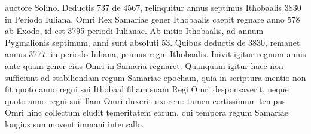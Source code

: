 auctore Solino.
Deductis 737 de 4567, relinquitur annus
septimus Ithobaalis 3830 in Periodo Iuliana.
Omri Rex Samariae
gener Ithobaalis caepit regnare anno 578 ab Exodo, id
est 3795 periodi Iulianae.
Ab initio Ithobaalis, ad annum Pygmalionis
septimum, anni sunt absoluti 53.
Quibus deductis de
3830, remanet annus 3777. in periodo Iuliana, primus regni
Ithobaalis.
Inivit igitur regnum  annis ante quam gener eius
Omri in Samaria regnaret.
Quanquam igitur haec non sufficiunt
ad stabiliendam regum Samariae epocham, quia in scriptura mentio
non fit quoto anno regni sui Ithobaal filiam suam Regi Omri desponsaverit,
neque quoto anno regni sui illam Omri duxerit uxorem:
tamen certissimum tempus Omri hinc collectum eludit temeritatem
eorum, qui tempora regum Samariae longius summovent
immani intervallo.


